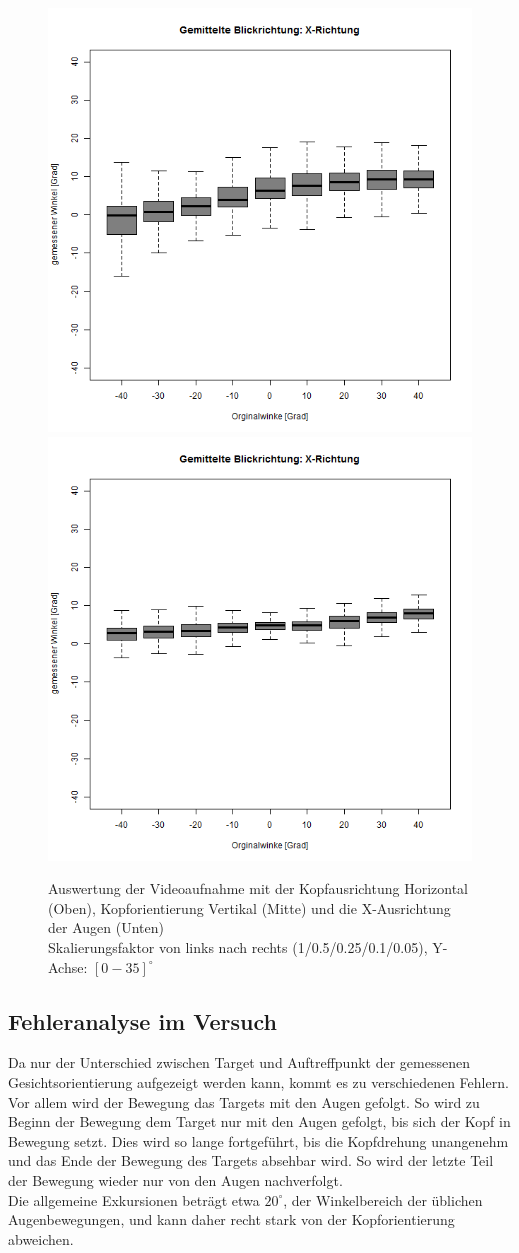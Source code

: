\begin{figure}
	\includegraphics[width=0.192\linewidth]{OpenFace_Img/EyeAVG_x_S01}
	\includegraphics[width=0.192\linewidth]{OpenFace_Img/EyeAVG_x_S005}
	\caption{Auswertung der Videoaufnahme mit der Kopfausrichtung Horizontal (Oben), Kopforientierung Vertikal (Mitte) und die X-Ausrichtung der Augen (Unten)\\Skalierungsfaktor von links nach rechts (1/0.5/0.25/0.1/0.05), Y-Achse: $[0-35]^\circ$}
	\label{graph_VideoSkalierung}
\end{figure}
\subsection{Fehleranalyse im Versuch}
Da nur der Unterschied zwischen Target und Auftreffpunkt der gemessenen Gesichtsorientierung aufgezeigt werden kann, kommt es zu verschiedenen Fehlern. Vor allem wird der Bewegung das Targets mit den Augen gefolgt.
So wird zu Beginn der Bewegung dem Target nur mit den Augen gefolgt, bis sich der Kopf in Bewegung setzt. Dies wird so lange fortgeführt, bis die Kopfdrehung unangenehm und das Ende der Bewegung des Targets absehbar wird. So wird der letzte Teil der Bewegung wieder nur von den Augen nachverfolgt.\\
Die allgemeine Exkursionen beträgt etwa $20^\circ$, der Winkelbereich der üblichen Augenbewegungen, und kann daher recht stark von der Kopforientierung abweichen.\cite{wiki_Gesichtsfeld}\\
